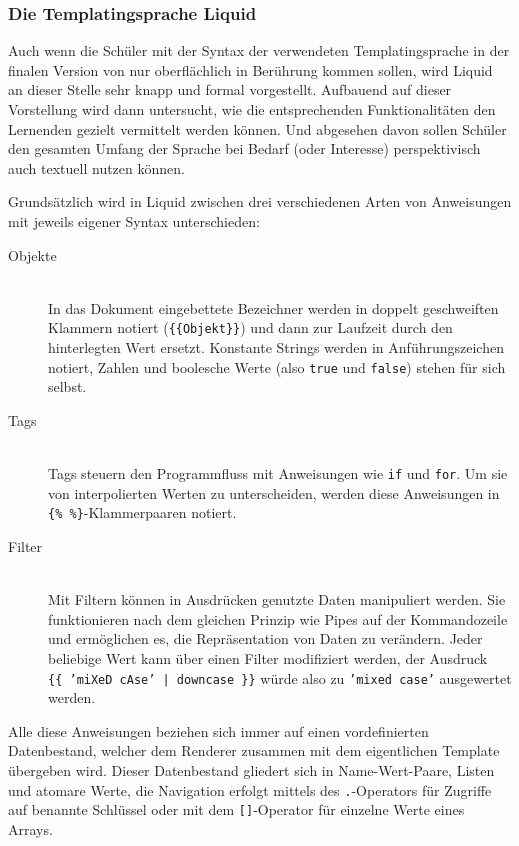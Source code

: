 \subsubsection{Die Templatingsprache Liquid}
\label{sec:liquid-language}

Auch wenn die Schüler mit der Syntax der verwendeten Templatingsprache in der finalen Version von \idename{} nur oberflächlich in Berührung kommen sollen, wird Liquid an dieser Stelle sehr knapp und formal vorgestellt. Aufbauend auf dieser Vorstellung wird dann untersucht, wie die entsprechenden Funktionalitäten den Lernenden gezielt vermittelt werden können. Und abgesehen davon sollen Schüler den gesamten Umfang der Sprache bei Bedarf (oder Interesse) perspektivisch auch textuell nutzen können.

Grundsätzlich wird in Liquid zwischen drei verschiedenen Arten von Anweisungen mit jeweils eigener Syntax unterschieden:

\begin{description}
\item[Objekte] \hfill \\
  In das Dokument eingebettete Bezeichner werden in doppelt geschweiften Klammern notiert (\texttt{\{\{Objekt\}\}}) und dann zur Laufzeit durch den hinterlegten Wert ersetzt. Konstante Strings werden in Anführungszeichen notiert, Zahlen und boole\-sche Werte (also \texttt{true} und \texttt{false}) stehen für sich selbst.
\item[Tags] \hfill \\
  Tags steuern den Programmfluss mit Anweisungen wie \texttt{if} und \texttt{for}. Um sie von interpolierten Werten zu unterscheiden, werden diese Anweisungen in \texttt{\{\% \%\}}-Klam\-mer\-paaren notiert.
\item[Filter] \hfill \\
  Mit Filtern können in Ausdrücken genutzte Daten manipuliert werden. Sie funktionieren nach dem gleichen Prinzip wie Pipes auf der Kommandozeile und ermöglichen es, die Repräsentation von Daten zu verändern. Jeder beliebige Wert kann über einen Filter modifiziert werden, der Ausdruck \texttt{\{\{~'miXeD cAse'~|~downcase~\}\}} würde also zu \texttt{'mixed case'} ausgewertet werden.
\end{description}

Alle diese Anweisungen beziehen sich immer auf einen vordefinierten Datenbestand, welcher dem Renderer zusammen mit dem eigentlichen Template übergeben wird. Dieser Datenbestand gliedert sich in Name-Wert-Paare, Listen und atomare Werte, die Navigation erfolgt mittels des \texttt{.}-Operators für Zugriffe auf benannte Schlüssel oder mit dem \texttt{[]}-Operator für einzelne Werte eines Arrays.

